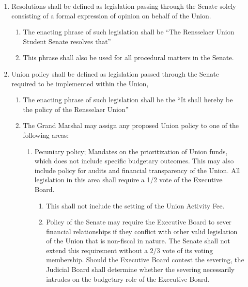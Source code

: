 \documentclass{uniondoc}
\begin{document}
\begin{enumerate}
\begin{enumerate}
		      \item The Student Senate Bylaws may be temporarily suspended by a 2/3 vote.
		            This suspension will stand until any of the following occur:
		            The meeting in which the Bylaws were temporarily suspended adjourned,
		            or the Senate reinstates these Bylaws by majority vote.
	      \end{enumerate}
	\item Resolutions shall be defined as legislation passing through the Senate solely consisting of a formal expression of opinion on behalf of the Union.
	      \begin{enumerate}
		      \item The enacting phrase of such legislation shall be ``The Rensselaer Union Student Senate resolves that''
		      \item This phrase shall also be used for all procedural matters in the Senate.
	      \end{enumerate}
	\item Union policy shall be defined as legislation passed through the Senate required to be implemented within the Union,
	      \begin{enumerate}
		      \item The enacting phrase of such legislation shall be the ``It shall hereby be the policy of the Rensselaer Union''
		      \item The Grand Marshal may assign any proposed Union policy to one of the following areas:
		            \begin{enumerate}
			            \item Pecuniary policy; Mandates on the prioritization of Union funds, which does not include specific budgetary outcomes.
			                  This may also include policy for audits and financial transparency of the Union.
			                  All legislation in this area shall require a 1/2 vote of the Executive Board.
			                  \begin{enumerate}
				                  \item This shall not include the setting of the Union Activity Fee.
				                  \item Policy of the Senate may require the Executive Board to sever financial relationships if they conflict with other valid legislation of the Union that is non-fiscal in nature.
				                        The Senate shall not extend this requirement without a 2/3 vote of its voting membership.
				                        Should the Executive Board contest the severing, the Judicial Board shall determine whether the severing necessarily intrudes on the budgetary role of the Executive Board.

\end{enumerate}
\end{enumerate}
\end{enumerate}
\end{enumerate}
\end{document}
